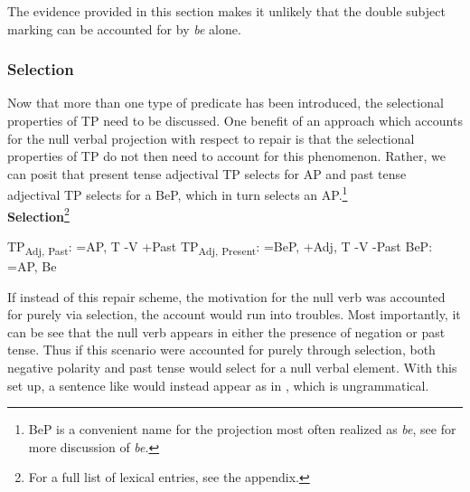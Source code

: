 \documentclass[output=paper]{langsci/langscibook}
\newcommand{\bee}[0]{\textit{be }}
\begin{document}
\begin{exe}
\ex\label{ex:burkholder:19} 
\end{exe}

The evidence provided in this section makes it unlikely that the double subject marking can be accounted for by \bee alone. 



\subsubsection{Selection} 

Now that more than one type of predicate has been introduced, the selectional properties of TP need to be discussed. One benefit of an approach which accounts for the null verbal projection with respect to repair is that the selectional properties of TP do not then need to account for this phenomenon. Rather, we can posit that present tense adjectival TP selects for AP and past tense adjectival TP selects for a BeP, which in turn selects an AP.\footnote{BeP is a convenient name for the projection most often realized as \textit{be}, see  for more discussion of \textit{be}.}\\

\noindent\textbf{Selection}\footnote{For a full list of lexical entries, see the appendix.}\\[-\baselineskip]
\begin{exe}
\ex\label{ex:burkholder:20} TP\textsubscript{Adj, Past}: =AP, T -V +Past
\ex\label{ex:burkholder:21} TP\textsubscript{Adj, Present}: =BeP, +Adj, T -V -Past
\ex\label{ex:burkholder:22} BeP: =AP, Be 
\end{exe}

If instead of this repair scheme, the motivation for the null verb was accounted for purely via selection, the account would run into troubles. Most importantly, it can be see that the null verb appears in either the presence of negation or past tense. Thus if this scenario were accounted for purely through selection, both negative polarity and past tense would select for a null verbal element. With this set up, a sentence like  would instead appear as in , which is ungrammatical.
\end{document}
